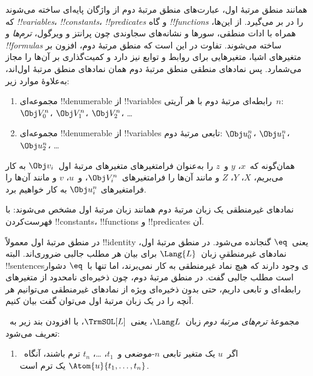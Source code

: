\documentclass[../../../include/open-logic-section]{subfiles}
\begin{document}


همانند منطق مرتبهٔ اول، عبارت‌های منطق مرتبهٔ دوم از واژگان پایه‌ای
ساخته می‌شوند که \emph{!!{variable}s}، \emph{!!{constant}s}،
\emph{!!{predicate}s} و گاه \emph{!!{function}s} را در بر می‌گیرد.
از این‌ها، همراه با ادات منطقی، سورها و نشانه‌های سجاوندی چون پرانتز و
ویرگول، \emph{ترم‌ها} و \emph{!!{formula}s} ساخته می‌شوند. تفاوت در این
است که منطق مرتبهٔ دوم، افزون بر متغیرهای اشیا، متغیرهایی برای روابط و
توابع نیز دارد و کمیت‌گذاری بر آن‌ها را مجاز می‌شمارد. پس نمادهای منطقی
منطق مرتبهٔ دوم همان نمادهای منطق مرتبهٔ اول‌اند، به‌علاوهٔ موارد زیر:

\begin{enumerate}
\item مجموعه‌ای !!{denumerable} از !!{variable}s رابطه‌ای مرتبهٔ دوم
  با هر آریتی~$n$: $\Obj V_0^n$، $\Obj V_1^n$، $\Obj V_2^n$، \dots
\item مجموعه‌ای !!{denumerable} از !!{variable}s تابعی مرتبهٔ دوم:
  $\Obj u_0^n$، $\Obj u_1^n$، $\Obj u_2^n$، \dots
\end{enumerate}

همان‌گونه که~$x$، $y$ و~$z$ را به‌عنوان فرامتغیرهای متغیرهای مرتبهٔ
اول~$\Obj v_i$ به کار می‌بریم، $X$، $Y$، $Z$ و مانند آن‌ها را
فرامتغیرهای~$\Obj V_i^n$، و~$u$، $v$ و مانند آن‌ها را فرامتغیرهای
$\Obj u_i^n$ به کار خواهیم برد.

\begin{explain}
نمادهای غیرمنطقی یک زبان مرتبهٔ دوم همانند زبان مرتبهٔ اول مشخص
می‌شوند: با فهرست‌کردن !!{constant}s، !!{function}s و !!{predicate}s آن.

در منطق مرتبهٔ اول معمولاً !!{identity} یعنی~$\eq$ گنجانده می‌شود. در
منطق مرتبهٔ اول، نمادهای غیرمنطقیِ زبان~$\Lang{L}$ برای بیان هر مطلب
جالبی ضروری‌اند. البته !!{sentence}sی وجود دارند که هیچ نماد غیرمنطقی
به کار نمی‌برند، اما تنها با~$\eq$ دشوار است مطلب جالبی گفت. در منطق
مرتبهٔ دوم، چون ذخیره‌ای نامحدود از متغیرهای رابطه‌ای و تابعی داریم، حتی
بدون ذخیره‌ای ویژه از نمادهای غیرمنطقی می‌توانیم هر آنچه را در یک زبان
مرتبهٔ اول می‌توان گفت بیان کنیم.
\end{explain}

\begin{defn}
مجموعهٔ \emph{ترم‌های مرتبهٔ دوم} زبان~$\Lang L$، یعنی~$\TrmSOL[L]$،
با افزودن بند زیر به~ تعریف می‌شود:
\begin{enumerate}
\item اگر~$u$ یک متغیر تابعی $n$-موضعی و~$t_1$، \dots، $t_n$ ترم
  باشند، آنگاه~$\Atom{u}{t_1, \ldots, t_n}$ یک ترم است.
\end{enumerate}
\end{defn}
\end{document}
